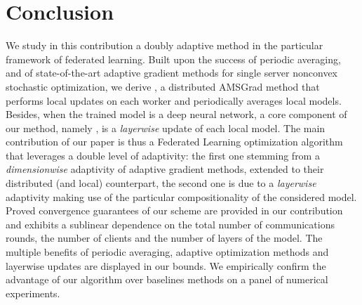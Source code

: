 \documentclass[11pt]{article}
\begin{document}



\section{Conclusion}\label{sec:conclusion}

We study in this contribution a doubly adaptive method in the particular framework of federated learning.
Built upon the success of periodic averaging, and of state-of-the-art adaptive gradient methods for single server nonconvex stochastic optimization, we derive \algo, a distributed AMSGrad method that performs local updates on each worker and periodically averages local models. 
Besides, when the trained model is a deep neural network, a core component of our method, namely \algo, is a \emph{layerwise} update of each local model.
The main contribution of our paper is thus a Federated Learning optimization algorithm that leverages a double level of adaptivity: the first one stemming from a \emph{dimensionwise} adaptivity of adaptive gradient methods, extended to their distributed (and local) counterpart, the second one is due to a  \emph{layerwise} adaptivity making use of the particular compositionality of the considered model.
Proved convergence guarantees of our scheme are provided in our contribution and exhibits a sublinear dependence on the total number of communications rounds, the number of clients and the number of layers of the model.
The multiple benefits of periodic averaging, adaptive optimization methods and layerwise updates are displayed in our bounds.
We empirically confirm the advantage of our algorithm over baselines methods on a panel of numerical experiments.
\end{document}
